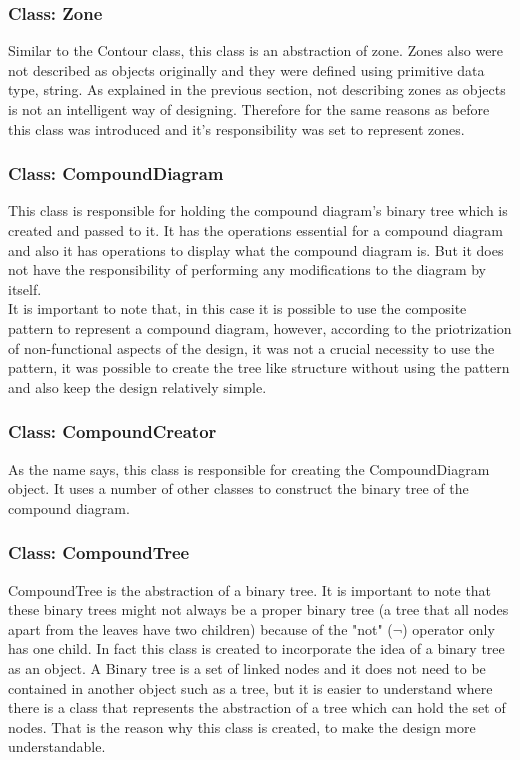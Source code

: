 \documentclass[10pt, a4paper, titlepage]{article}
\begin{document}
\subsubsection{Class: Zone}
Similar to the Contour class, this class is an abstraction of zone. Zones also were not described as objects originally and they were defined using primitive data type, string. As explained in the previous section, not describing zones as objects is not an intelligent way of designing. Therefore for the same reasons as before this class was introduced and it's responsibility was set to represent zones.

\subsubsection{Class: CompoundDiagram}
This class is responsible for holding the compound diagram's binary tree which is created and passed to it. It has the operations essential for a compound diagram and also it has operations to display what the compound diagram is. But it does not have the responsibility of performing any modifications to the diagram by itself. \\
It is important to note that, in this case it is possible to use the composite pattern to represent a compound diagram, however, according to the priotrization of non-functional aspects of the design, it was not a crucial necessity to use the pattern, it was possible to create the tree like structure without using the pattern and also keep the design relatively simple.

\subsubsection{Class: CompoundCreator}
As the name says, this class is responsible for creating the CompoundDiagram object. It uses a number of other classes to construct the binary tree of the compound diagram. 

\subsubsection{Class: CompoundTree}
CompoundTree is the abstraction of a binary tree. It is important to note that these binary trees might not always be a proper binary tree (a tree that all nodes apart from the leaves have two children) because of the "not" ($ \neg $) operator only has one child. In fact this class is created to incorporate the idea of a binary tree as an object. A Binary tree is a set of linked nodes and it does not need to be contained in another object such as a tree, but it is easier to understand where there is a class that represents the abstraction of a tree which can hold the set of nodes. That is the reason why this class is created, to make the design more understandable.
\end{document}
